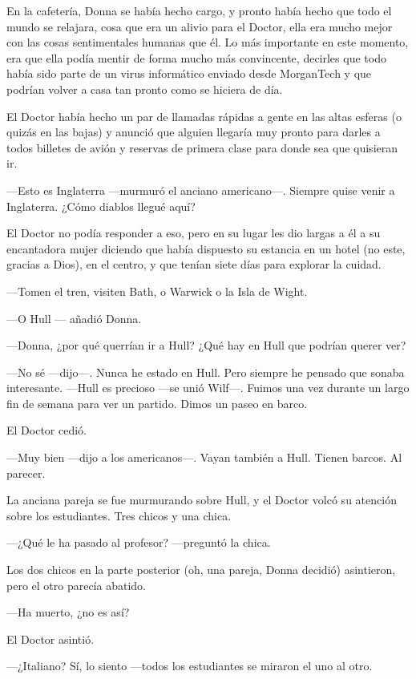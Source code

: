 En la cafetería, Donna se había hecho cargo, y pronto había hecho que
todo el mundo se relajara, cosa que era un alivio para el Doctor, ella
era mucho mejor con las cosas sentimentales humanas que él. Lo más
importante en este momento, era que ella podía mentir de forma mucho más
convincente, decirles que todo había sido parte de un virus informático
enviado desde MorganTech y que podrían volver a casa tan pronto como se
hiciera de día.

El Doctor había hecho un par de llamadas rápidas a gente en las altas
esferas (o quizás en las bajas) y anunció que alguien llegaría muy
pronto para darles a todos billetes de avión y reservas de primera clase
para donde sea que quisieran ir.

---Esto es Inglaterra ---murmuró el anciano americano---. Siempre quise
venir a Inglaterra. ¿Cómo diablos llegué aquí?

El Doctor no podía responder a eso, pero en su lugar les dio largas a él
a su encantadora mujer diciendo que había dispuesto su estancia en un
hotel (no este, gracias a Dios), en el centro, y que tenían siete días
para explorar la cuidad.

---Tomen el tren, visiten Bath, o Warwick o la Isla de Wight.

---O Hull --- añadió Donna.

---Donna, ¿por qué querrían ir a Hull? ¿Qué hay en Hull que podrían
querer ver?

---No sé ---dijo---. Nunca he estado en Hull. Pero siempre he pensado
que sonaba interesante. ---Hull es precioso ---se unió Wilf---. Fuimos
una vez durante un largo fin de semana para ver un partido. Dimos un
paseo en barco.

El Doctor cedió.

---Muy bien ---dijo a los americanos---. Vayan también a Hull. Tienen
barcos. Al parecer.

La anciana pareja se fue murmurando sobre Hull, y el Doctor volcó su
atención sobre los estudiantes. Tres chicos y una chica.

---¿Qué le ha pasado al profesor? ---preguntó la chica.

Los dos chicos en la parte posterior (oh, una pareja, Donna decidió)
asintieron, pero el otro parecía abatido.

---Ha muerto, ¿no es así?

El Doctor asintió.

---¿Italiano? Sí, lo siento ---todos los estudiantes se miraron el uno
al otro.

